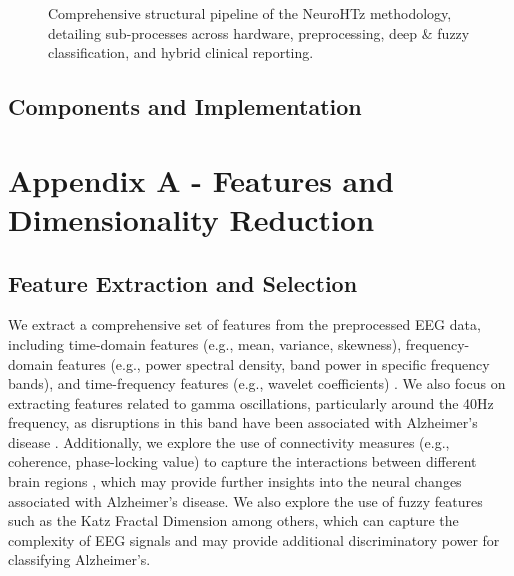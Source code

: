 \documentclass[openany]{book}
\begin{document}
\begin{figure}[htpb]
{
    }
    \caption{Comprehensive structural pipeline of the NeuroHTz methodology, detailing sub-processes across hardware, preprocessing, deep \& fuzzy classification, and hybrid clinical reporting.}
    \label{fig:summary_pipeline}
\end{figure}

\section{Components and Implementation}






\chapter*{Appendix A - Features and Dimensionality Reduction}
\label{app:A}
\section{Feature Extraction and Selection}
\label{sec:feat_extract}
We extract a comprehensive set of features from the preprocessed EEG data, including time-domain features (e.g., mean, variance, skewness), frequency-domain features (e.g., power spectral density, band power in specific frequency bands), and time-frequency features (e.g., wavelet coefficients) \cite{cassani2020review}. We also focus on extracting features related to gamma oscillations, particularly around the 40Hz frequency, as disruptions in this band have been associated with Alzheimer's disease \cite{martorell2019gamma}. Additionally, we explore the use of connectivity measures (e.g., coherence, phase-locking value) to capture the interactions between different brain regions \cite{stam2007graph}, which may provide further insights into the neural changes associated with Alzheimer's disease. We also explore the use of fuzzy features such as the Katz Fractal Dimension among others, which can capture the complexity of EEG signals and may provide additional discriminatory power for classifying Alzheimer's. \\
\end{document}
